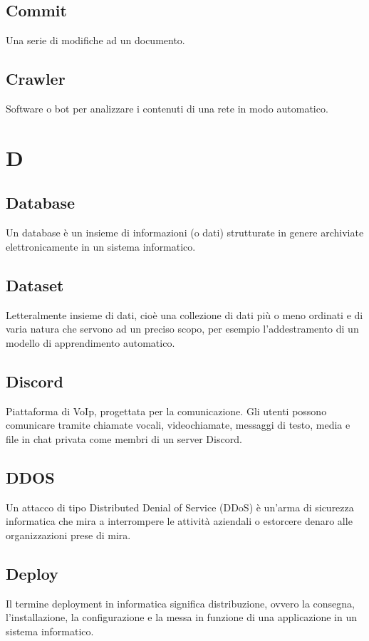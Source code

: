 \documentclass{classes/base}
\begin{document}
        \subsection*{Commit}
        Una serie di modifiche ad un documento.
        
        \subsection*{Crawler}
        Software o bot per analizzare i contenuti di una rete in modo automatico.
        
        \newpage  
    \section{D}
        \subsection*{Database}
        Un database è un insieme di informazioni (o dati) strutturate in genere archiviate elettronicamente in un sistema informatico.

        \subsection*{Dataset}
        Letteralmente insieme di dati, cioè una collezione di dati più o meno ordinati e di varia natura che servono ad un preciso scopo, per esempio l'addestramento di un modello di apprendimento automatico.
       
        \subsection*{Discord}
        Piattaforma di VoIp, progettata per la comunicazione. Gli utenti possono comunicare tramite chiamate vocali, videochiamate, messaggi di testo, media e file in chat privata come membri di un server Discord.

        \subsection*{DDOS}
        Un attacco di tipo Distributed Denial of Service (DDoS) è un'arma di sicurezza informatica che mira a interrompere le attività aziendali o estorcere denaro alle organizzazioni prese di mira.

        \subsection*{Deploy}
        Il termine deployment in informatica significa distribuzione, ovvero la consegna, l'installazione, la configurazione e la messa in funzione di una applicazione in un sistema informatico.
\end{document}
